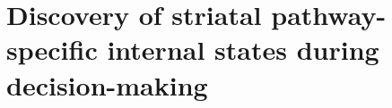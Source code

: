\chapter{Discovery of striatal pathway-specific internal states during decision-making\label{ch:glmhmm}}





